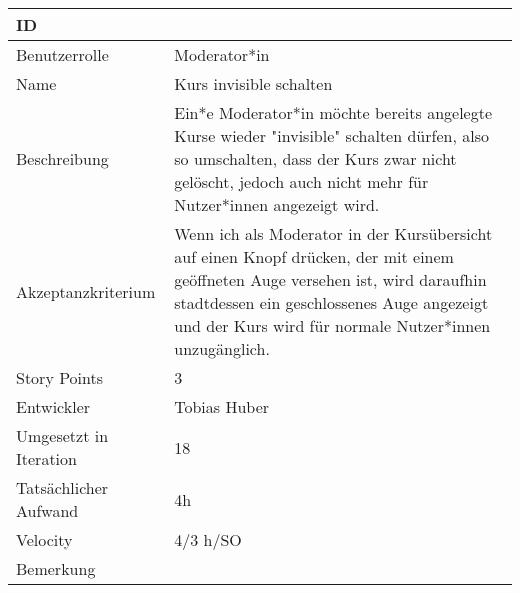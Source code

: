 \begin{tabularx}{\textwidth}{|p{}|X|}
	\hline
	ID & \\
	\hline
	Benutzerrolle & Moderator*in\\
	\hline
	Name & Kurs invisible schalten\\
	\hline
	Beschreibung & Ein*e Moderator*in möchte bereits angelegte Kurse wieder "invisible" schalten dürfen, also so umschalten, dass der Kurs zwar nicht gelöscht, jedoch auch nicht mehr für Nutzer*innen angezeigt wird.\\
	\hline
	Akzeptanzkriterium & Wenn ich als Moderator in der Kursübersicht auf einen Knopf drücken, der mit einem geöffneten Auge versehen ist, wird daraufhin stadtdessen ein geschlossenes Auge angezeigt und der Kurs wird für normale Nutzer*innen unzugänglich.\\
	\hline
	Story Points & 3\\
	\hline
	Entwickler & Tobias Huber\\
	\hline
	Umgesetzt in Iteration & 18\\
	\hline
	Tatsächlicher Aufwand & 4h\\
	\hline
	Velocity & 4/3 h/SO\\
	\hline
	Bemerkung & \\
	\hline
\end{tabularx}
\vspace{20pt}
